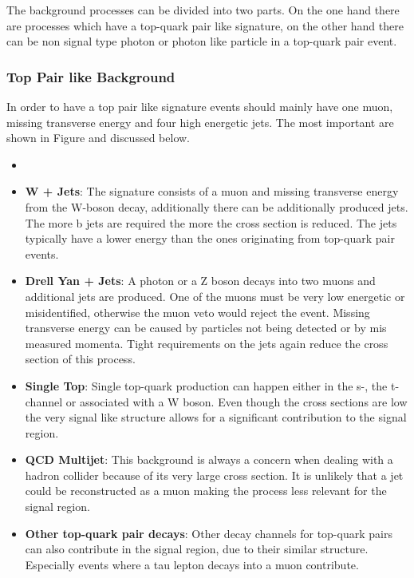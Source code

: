 The background processes can be divided into two parts. On the one hand there are processes which have a top-quark pair like signature, on the other hand there can be non signal type photon or photon like particle in a top-quark pair event.\\

\subsubsection{Top Pair like Background}

In order to have a top pair like signature events should mainly have one muon, missing transverse energy and four high energetic jets. The most important are shown in Figure  and discussed below.

\begin{itemize}
\item {}
\item \textbf{W + Jets}: The signature consists of a muon and missing transverse energy from the W-boson decay, additionally there can be additionally produced jets. The more b jets are required the more the cross section is reduced. The jets typically have a lower energy than the ones originating from top-quark pair events.
\item \textbf{Drell Yan + Jets}: A photon or a Z boson decays into two muons and additional jets are produced. One of the muons must be very low energetic or misidentified, otherwise the muon veto  would reject the event. Missing transverse energy can be caused by particles not being detected or by mis measured momenta. Tight requirements on the jets again reduce the cross section of this process.
\item \textbf{Single Top}: Single top-quark production can happen either in the s-, the t-channel or associated with a W boson. Even though the cross sections are low  the very signal like structure allows for a significant contribution to the signal region.
\item \textbf{QCD Multijet}: This background is always a concern when dealing with a hadron collider because of its very large cross section. It is unlikely that a jet could be reconstructed as a muon making the process less relevant for the signal region.
\item \textbf{Other top-quark pair decays}: Other decay channels for top-quark pairs can also contribute in the signal region, due to their similar structure. Especially events where a tau lepton decays into a muon contribute. 
\end{itemize}


